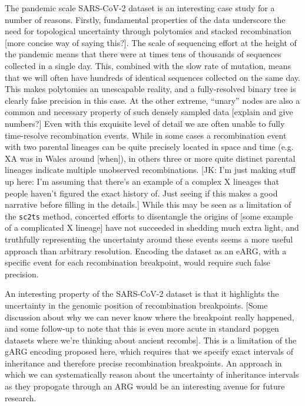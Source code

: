 \documentclass{article}
\begin{document}
The pandemic scale SARS-CoV-2 dataset is an interesting case study
for a number of reasons.
Firstly, fundamental properties of the data underscore the
need for topological uncertainty through polytomies
and stacked recombination [more concise way of saying this?].
The scale of sequencing effort at the height
of the pandemic means that there were at times tens of thousands
of sequences collected in a single day. This, combined with
the slow rate of mutation, means that we will often have hundreds
of identical sequences collected on the same day.
This makes polytomies an unescapable reality, and a
fully-resolved binary tree is clearly false precision in this case.
At the other extreme, ``unary'' nodes are also a common and
necessary property of such densely sampled data [explain and
give numbers?]
Even with this exquisite level of detail we are
often unable to fully time-resolve recombination events. While
in some cases a recombination event with two parental lineages
can be quite precisely located in space and time (e.g. XA was in Wales
around [when]), in others three or more quite distinct parental
lineages indicate multiple unobserved recombinations.
[JK: I'm just making stuff up here: I'm assuming that there's an
example of a complex X lineages that people haven't figured the
exact history of. Just seeing if this makes a good narrative
before filling in the details.]
While this
may be seen as a limitation of the \texttt{sc2ts} method,
concerted efforts to disentangle the origins of [some example
of a complicated X lineage] have not succeeded in shedding
much extra light, and truthfully representing the uncertainty
around these events seems a more useful approach than
 arbitrary resolution. Encoding the dataset as an eARG,
with a specific event for each recombination breakpoint,
would require such false precision.

An interesting property of the SARS-CoV-2 dataset is that
it highlights the uncertainty in the genomic position of
recombination breakpoints. [Some discussion about why
we can never know where the breakpoint really happened, and
some follow-up to note that this is even more acute in
standard popgen datasets where we're thinking about ancient
recombs].
This is a limitation of the
gARG encoding proposed here, which requires that we specify
exact intervals of inheritance and therefore precise
recombination breakpoints.
An approach in which we can systematically reason about the
uncertainty of inheritance intervals as they propogate
through an ARG
would be an interesting avenue for future research.
\end{document}
